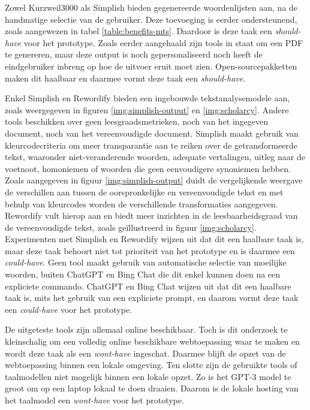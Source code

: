 \medspace

Zowel Kurzweil3000 als Simplish bieden gegenereerde woordenlijsten aan, na de handmatige selectie van de gebruiker. Deze toevoeging is eerder ondersteunend, zoals aangewezen in tabel \ref{table:benefits-mts}. Daardoor is deze taak een \textit{should-have} voor het prototype. Zoals eerder aangehaald zijn tools in staat om een PDF te genereren, maar deze output is noch gepersonaliseerd noch heeft de eindgebruiker inbreng op hoe de uitvoer eruit moet zien. Open-sourcepakketten maken dit haalbaar en daarmee vormt deze taak een \textit{should-have}.

\medspace

Enkel Simplish en Rewordify bieden een ingebouwde tekstanalysemodele aan, zoals weergegeven in figuren \ref{img:simplish-output} en \ref{img:scholarcy}. Andere tools beschikken over geen leesgraadsmetrieken, noch van het ingegeven document, noch van het vereenvoudigde document. Simplish maakt gebruik van kleurcodecriteria om meer transparantie aan te reiken over de getransformeerde tekst, waaronder niet-veranderende woorden, adequate vertalingen, uitleg naar de voetnoot, homoniemen of woorden die geen eenvoudigere synoniemen hebben. Zoals aangegeven in figuur \ref{img:simplish-output} duidt de vergelijkende weergave de verschillen aan tussen de oorspronkelijke en vereenvoudigde tekst en met behulp van kleurcodes worden de verschillende transformaties aangegeven. Rewordify vult hierop aan en biedt meer inzichten in de leesbaarheidsgraad van de vereenvoudigde tekst, zoals geïllustreerd in figuur \ref{img:scholarcy}. Experimenten met Simplish en Rewordify wijzen uit dat dit een haalbare taak is, maar deze taak behoort niet tot prioriteit van het prototype en is daarmee een \textit{could-have}. Geen tool maakt gebruik van automatische selectie van moeilijke woorden, buiten ChatGPT en Bing Chat die dit enkel kunnen doen na een expliciete commando. ChatGPT en Bing Chat wijzen uit dat dit een haalbare taak is, mits het gebruik van een expliciete prompt, en daarom vormt deze taak een \textit{could-have} voor het prototype.

\medspace

De uitgeteste tools zijn allemaal online beschikbaar. Toch is dit onderzoek te kleinschalig om een volledig online beschikbare webtoepassing waar te maken en wordt deze taak als een \textit{wont-have} ingeschat. Daarmee blijft de opzet van de webtoepassing binnen een lokale omgeving. Ten slotte zijn de gebruikte tools of taalmodellen niet mogelijk binnen een lokale opzet. Zo is het GPT-3 model te groot om op een laptop lokaal te doen draaien. Daarom is de lokale hosting van het taalmodel een \textit{wont-have} voor het prototype. 

